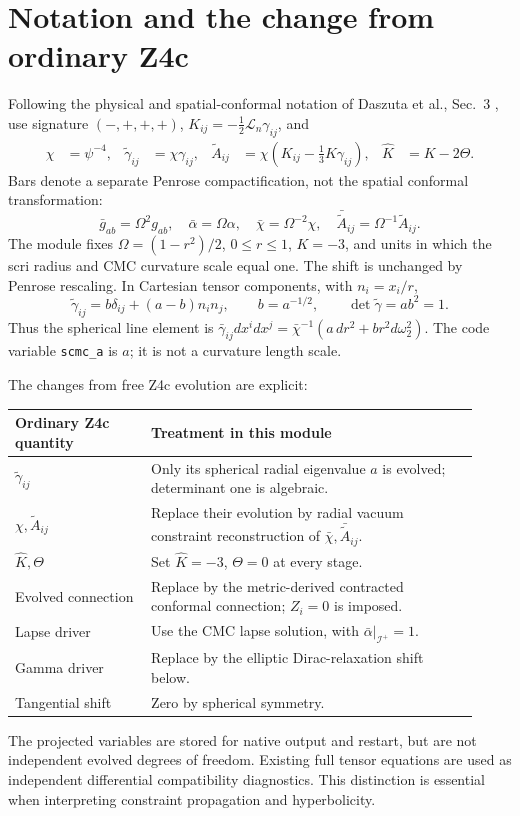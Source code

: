 \documentclass[11pt]{article}
\newcommand{\Om}{\Omega}
\newcommand{\bc}{\bar\chi}
\newcommand{\ba}{\bar\alpha}
\newcommand{\Ac}{\bar{\tilde A}}
\newcommand{\tg}{\tilde\gamma}
\newcommand{\scri}{\mathscr{I}^+}
\begin{document}
\section{Notation and the change from ordinary Z4c}
Following the physical and spatial-conformal notation of Daszuta et al.,
Sec.~3 \cite{daszuta}, use signature $(-,+,+,+)$,
$K_{ij}=-\frac12\mathcal L_n\gamma_{ij}$, and
\begin{align}
 \chi&=\psi^{-4}, & \tg_{ij}&=\chi\gamma_{ij}, &
 \tilde A_{ij}&=\chi(K_{ij}-\tfrac13 K\gamma_{ij}), &
 \widehat K&=K-2\Theta.
\end{align}
Bars denote a separate Penrose compactification, not the spatial conformal
transformation:
\begin{equation}
 \bar g_{ab}=\Om^2g_{ab},\quad \ba=\Om\alpha,\quad
 \bc=\Om^{-2}\chi,\quad \Ac_{ij}=\Om^{-1}\tilde A_{ij}.
\end{equation}
The module fixes $\Om=(1-r^2)/2$, $0\leq r\leq1$, $K=-3$, and units in which
the scri radius and CMC curvature scale equal one. The shift is unchanged by
Penrose rescaling. In Cartesian tensor components, with $n_i=x_i/r$,
\begin{equation}
 \tg_{ij}=b\delta_{ij}+(a-b)n_i n_j,\qquad b=a^{-1/2},\qquad \det\tg=ab^2=1.
 \label{eq:metric}
\end{equation}
Thus the spherical line element is
$\bar\gamma_{ij}dx^idx^j=\bc^{-1}(a\,dr^2+b r^2d\omega_2^2)$.
The code variable \texttt{scmc\_a} is $a$; it is not a curvature length scale.

The changes from free Z4c evolution are explicit:
\begin{center}
\begin{tabular}{p{0.27\linewidth}p{0.65\linewidth}}
\toprule
Ordinary Z4c quantity & Treatment in this module\\\midrule
$\tg_{ij}$ & Only its spherical radial eigenvalue $a$ is evolved; determinant one is algebraic.\\
$\chi,\tilde A_{ij}$ & Replace their evolution by radial vacuum constraint reconstruction of $\bc,\Ac_{ij}$.\\
$\widehat K,\Theta$ & Set $\widehat K=-3$, $\Theta=0$ at every stage.\\
Evolved connection & Replace by the metric-derived contracted conformal connection; $Z_i=0$ is imposed.\\
Lapse driver & Use the CMC lapse solution, with $\ba|_{\scri}=1$.\\
Gamma driver & Replace by the elliptic Dirac-relaxation shift below.\\
Tangential shift & Zero by spherical symmetry.\\\bottomrule
\end{tabular}
\end{center}
The projected variables are stored for native output and restart, but are not
independent evolved degrees of freedom. Existing full tensor equations are used
as independent differential compatibility diagnostics. This distinction is
essential when interpreting constraint propagation and hyperbolicity.
\end{document}
